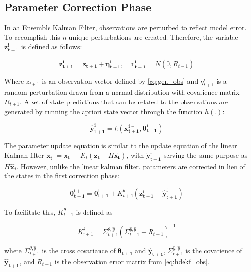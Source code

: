 \subsection{Parameter Correction Phase}

In an Ensemble Kalman Filter, observations are perturbed to reflect model error. To accomplish this $n$ unique perturbations are created. Therefore, the variable $\mathbf{z_{t+1}^{i}}$ is defined as follows:

\begin{equation}\label{eq:hdekf_obs}
\mathbf{z_{t+1}^{i}} = \mathbf{z_{t+1}} + \mathbf{\eta_{t+1}^{i}},\quad \mathbf{\eta_{t+1}^{i}} = N(0,R_{t+1})
\end{equation}

Where $z_{t+1}$ is an observation vector defined by \eqref{eq:gen_obs} and $\eta_{t+1}^{i}$ is a random perturbation drawn from a normal distribution with covarience matrix $R_{t+1}$. A set of state predictions that can be related to the observations are generated by running the apriori state vector through the function $h(.)$:

\begin{equation}\label{eq:hdekf_pred}
\mathbf{\hat{y}_{t+1}^{i}} = h(\mathbf{x_{t+1}^{i-}}, \mathbf{\theta_{t+1}^{i-}})
\end{equation}

The parameter update equation is similar to the update equation of the linear Kalman filter $\mathbf{x^{+}_{t}} = \mathbf{x^{-}_{t}} + K_{t}(\mathbf{z_{t}}-H\mathbf{\hat{x}_{t}})$, with $\mathbf{\hat{y}_{t+1}^{i}}$ serving the same purpose as $H\mathbf{\hat{x}_{t}}$. However, unlike the linear kalman filter,  parameters are corrected in lieu of the states in the first correction phase:

\begin{equation}\label{eq:hdekf_param_update}
\mathbf{\theta_{t+1}^{i+}} = \mathbf{\theta_{t+1}^{i-}} + K_{t+1}^{\theta}(\mathbf{z_{t+1}^{i}}-\mathbf{\hat{y}_{t+1}^{i}})
\end{equation}

To facilitate this, $K_{t+1}^{\theta}$ is defined as

\begin{equation}\label{eq:hdekf_param_k}
K_{t+1}^{\theta} = \Sigma^{\theta,\hat{y}}_{t+1}(\Sigma^{\hat{y},\hat{y}}_{t+1} + R_{t+1})^{-1}
\end{equation}

where $\Sigma^{\theta,\hat{y}}_{t+1}$ is the cross covariance of $\mathbf{\theta_{t+1}}$ and $\mathbf{\hat{y}_{t+1}}$, $\Sigma^{\hat{y},\hat{y}}_{t+1}$ is the covarience of $\mathbf{\hat{y}_{t+1}}$, and $R_{t+1}$ is the observation error matrix from \eqref{eq:hdekf_obs}. 

